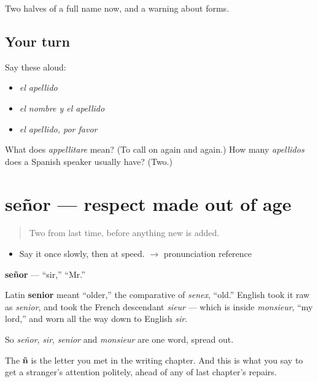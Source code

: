 \begin{grammarlens}[title={What you've built}]
Two halves of a full name now, and a warning about forms.
\end{grammarlens}

\subsection*{Your turn}
Say these aloud:

\begin{itemize}
\raggedright
  \item \emph{el apellido}
  \item \emph{el nombre y el apellido}
  \item \emph{el apellido, por favor}
\end{itemize}

\begin{tcolorbox}[breakable,colback=teal!4,colframe=teal!35!black,title={Before you move on}]
What does \emph{appellitare} mean? (To call on again and again.) How many \emph{apellidos} does a Spanish speaker usually have? (Two.)
\end{tcolorbox}
\section[señor]{señor — respect made out of age}

\label{lesson:ES-C305-senor}



\begin{quote}
Two from last time, before anything new is added.
\end{quote}

\begin{sounds}
\begin{itemize}
\raggedright
  \item Say it once slowly, then at speed. $\to$ pronunciation reference
\end{itemize}
\end{sounds}

\begin{cousinweb}
\textbf{señor} — \textquotedblleft{}sir,\textquotedblright{} \textquotedblleft{}Mr.\textquotedblright{}

Latin \textbf{senior} meant \textquotedblleft{}older,\textquotedblright{} the comparative of \emph{senex}, \textquotedblleft{}old.\textquotedblright{} English took it raw as \emph{senior}, and took the French descendant \emph{sieur} — which is inside \emph{monsieur}, \textquotedblleft{}my lord,\textquotedblright{} and worn all the way down to English \emph{sir}.

So \emph{señor}, \emph{sir}, \emph{senior} and \emph{monsieur} are one word, spread out.

The \textbf{ñ} is the letter you met in the writing chapter. And this is what you say to get a stranger's attention politely, ahead of any of last chapter's repairs.
\end{cousinweb}

